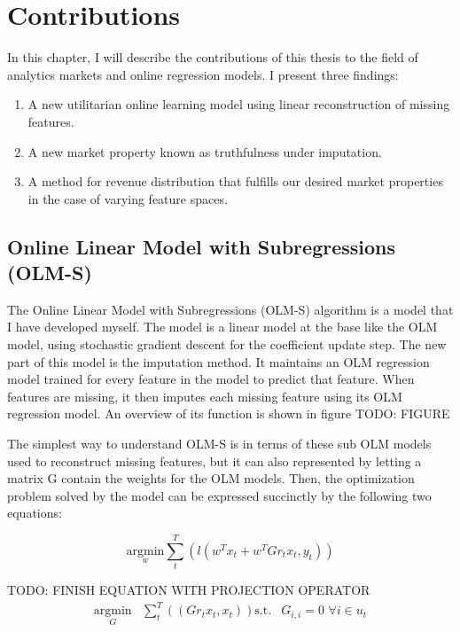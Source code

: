
\chapter{Contributions}

In this chapter, I will describe the contributions of this thesis to the field
of analytics markets and online regression models. I present three findings:
\begin{enumerate}
  \item A new utilitarian online learning model using linear reconstruction of missing features.
  \item A new market property known as truthfulness under imputation.
  \item A method for revenue distribution that fulfills our desired market properties in the case of varying feature spaces.
\end{enumerate}

\section{Online Linear Model with Subregressions (OLM-S)}

The Online Linear Model with Subregressions (OLM-S) algorithm is a model that I
have developed myself. The model is a linear model at the base like the OLM
model, using stochastic gradient descent for the coefficient update step. The
new part of this model is the imputation method. It maintains an OLM regression
model trained for every feature in the model to predict that feature. When
features are missing, it then imputes each missing feature using its OLM
regression model. An overview of its function is shown in figure TODO: FIGURE

The simplest way to understand OLM-S is in terms of these sub OLM models used
to reconstruct missing features, but it can also represented by letting a
matrix G contain the weights for the OLM models. Then, the optimization problem
solved by the model can be expressed succinctly by the following two equations:

\begin{equation}
  \underset{w}{\text {argmin}} \sum_{t}^{T} ( l(w^T x_t + w^T Gr_t x_t, y_t) )
\end{equation}

TODO: FINISH EQUATION WITH PROJECTION OPERATOR
\begin{align}
  \underset{G}{\text {argmin}} &\sum_{t}^{T} ( (Gr_t x_t, x_t) )
  \text{s.t.} & G_{i,i} = 0 \,\, \forall i \in u_t
\end{align}

